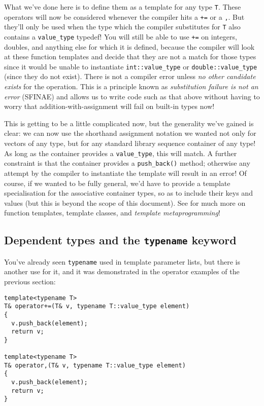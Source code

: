 \documentclass[a4paper]{scrartcl}
\begin{document}
What we've done here is to define them as a template for any type \verb|T|. These operators will now be considered whenever the compiler hits a \verb|+=| or a \verb|,|. But they'll only be used when the type which the compiler substitutes for \verb|T| also contains a \verb|value_type| typedef! You will still be able to use \verb|+=| on integers, doubles, and anything else for which it is defined, because the compiler will look at these function templates and decide that they are not a match for those types since it would be unable to instantiate \verb|int::value_type| or \verb|double::value_type| (since they do not exist). There is not a compiler error unless \emph{no other candidate exists} for the operation. This is a principle known as \emph{substitution failure is not an error} (SFINAE) and allows us to write code such as that above without having to worry that addition-with-assignment will fail on built-in types now!

This is getting to be a little complicated now, but the generality we've gained is clear: we can now use the shorthand assignment notation we wanted not only for vectors of any type, but for any standard library sequence container of any type! As long as the container provides a \verb|value_type|, this will match. A further constraint is that the container provides a \verb|push_back()| method; otherwise any attempt by the compiler to instantiate the template will result in an error! Of course, if we wanted to be fully general, we'd have to provide a template specialisation for the associative container types, so as to include their keys and values (but this is beyond the scope of this document). See\cite{Templates} for much more on function templates, template classes, and \emph{template metaprogramming}!

\subsection{Dependent types and the \texttt{typename} keyword}
You've already seen \verb|typename| used in template parameter lists, but there is another use for it, and it was demonstrated in the operator examples of the previous section:
\begin{verbatim}
template<typename T>
T& operator+=(T& v, typename T::value_type element)
{
  v.push_back(element);
  return v;
}

template<typename T>
T& operator,(T& v, typename T::value_type element)
{
  v.push_back(element);
  return v;
}
\end{verbatim}
\end{document}
